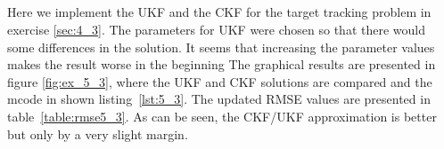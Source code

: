 \documentclass[a4paper,oneside,article]{memoir}
\begin{document}
\begin{table}[h]
	\centering
	
	\label{table:rmse5_2}
\end{table}

\clearpage



\subsection{}\label{sec:5_3}

Here we implement the UKF and the CKF for the target tracking problem in exercise \ref{sec:4_3}.
The parameters for UKF were chosen so that there would some differences in the solution. It seems
that increasing the parameter values makes the result worse in the beginning
The graphical results are presented in figure \ref{fig:ex_5_3}, where the UKF and CKF solutions
are compared and the mcode in shown listing~\ref{lst:5_3}. The updated RMSE values are presented
in table~\ref{table:rmse5_3}. As can be seen, the CKF/UKF approximation is better but only by a very
slight margin. 
\end{document}
